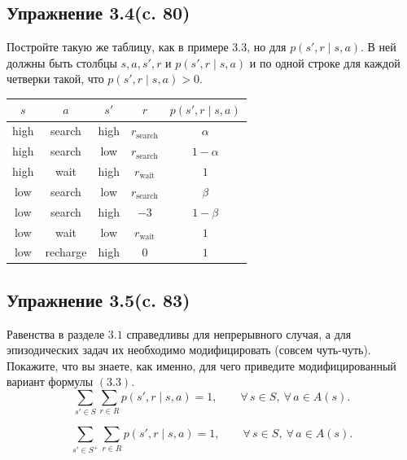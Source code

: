 \subsection{Упражнение 3.4(c. 80)}
Постройте такую же таблицу, как в примере 3.3, но для $p(s', r \mid s, a)$. В ней должны быть столбцы $s, a, s', r$ и $p(s', r \mid s, a)$ и по одной строке для каждой четверки такой, что $p(s', r \mid s, a) > 0$.
\begin{solution}
\leavevmode\par
\medskip
    \begin{center}
    \begin{tabular}{c c c c c}
    \hline
    $s$ & $a$ & $s'$ & $r$ & $p(s',r\mid s,a)$ \\
    \hline
    high & search & high & $r_{\text{search}}$ & $\alpha$ \\
    high & search & low  & $r_{\text{search}}$ & $1-\alpha$ \\
    \hline
    high & wait   & high & $r_{\text{wait}}$   & $1$ \\
    \hline
    low  & search & low  & $r_{\text{search}}$ & $\beta$ \\
    low  & search & high & $-3$                & $1-\beta$ \\
    \hline
    low  & wait   & low  & $r_{\text{wait}}$   & $1$ \\
    \hline
    low  & recharge & high & $0$               & $1$ \\
    \hline
    \end{tabular}
    \end{center}
\end{solution}

\subsection{Упражнение 3.5(c. 83)}
Равенства в разделе $3.1$ справедливы для непрерывного случая, а для эпизодических задач их необходимо модифицировать (совсем чуть-чуть). Покажите, что вы знаете, как именно, для чего приведите модифицированный вариант формулы $(3.3)$. 
\begin{equation}
\sum_{s' \in S} \sum_{r \in R}
p(s', r \mid s, a) = 1,
\qquad
\forall\, s \in S,
\ \forall\, a \in A(s).
\tag{3.3}
\end{equation}
\begin{solution}
    \[
    \sum_{s' \in S^+} \sum_{r \in R}
    p(s', r \mid s, a) = 1,
    \qquad
    \forall\, s \in S,
    \ \forall\, a \in A(s).
    \]
\end{solution}

